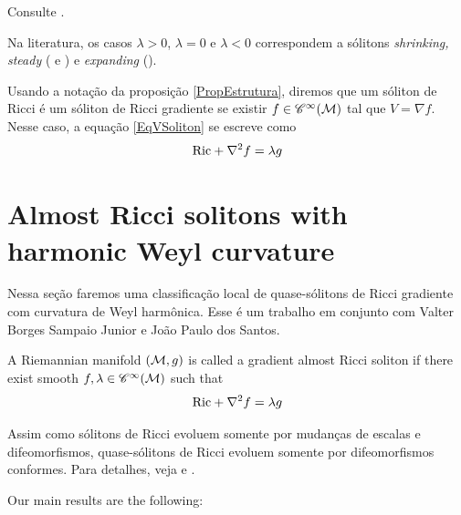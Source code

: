   \begin{demm}
    Consulte .
  \end{demm}



  \begin{oobs}
    Na literatura, os casos $\lambda > 0$, $\lambda = 0$ e $\lambda < 0$ correspondem a sólitons \emph{shrinking, steady} ( e ) e \emph{expanding} ().
    \end{oobs}


    \begin{oobs}\label{OGradSoliton}
      Usando a notação da proposição \cref{PropEstrutura}, diremos que um sóliton de Ricci é um sóliton de Ricci gradiente se existir $f \in \mathscr{C}^{\infty}(\mathcal{M})$ tal que $V = \nabla f$. Nesse caso, a equação \cref{EqVSoliton} se escreve como
      \begin{equation}\label{GradSoliton}
      \mathrm{Ric} + \nabla^2 f = \lambda g
      \end{equation}
      \end{oobs}
      

\section{Almost Ricci solitons with harmonic Weyl curvature}
      Nessa seção faremos uma classificação local de quase-sólitons de Ricci gradiente com curvatura de Weyl harmônica. Esse é um trabalho em conjunto com Valter Borges Sampaio Junior e João Paulo dos Santos.
      \begin{deff}\label{DefAlmostGradSoliton}
      A Riemannian manifold $\left(\mathcal{M}, g\right)$ is called a gradient almost Ricci soliton  if there exist smooth $f, \lambda \in \mathscr{C}^{\infty}(\mathcal{M})$ such that 
      \begin{equation}\label{AlmostGradSoliton}
      \mathrm{Ric} + \nabla^2 f = \lambda g
      \end{equation}
      \end{deff}

      \begin{oobs}
        Assim como sólitons de Ricci evoluem somente por mudanças de escalas e difeomorfismos, quase-sólitons de Ricci evoluem somente por difeomorfismos conformes. Para detalhes, veja  e .
        \end{oobs}

        Our main results are the following:
        

